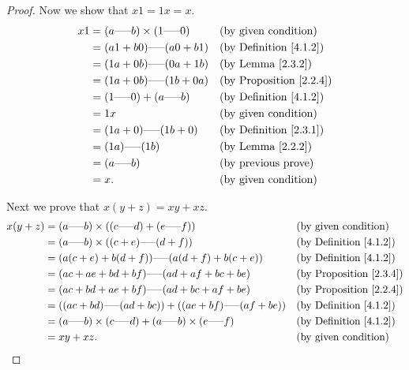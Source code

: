\begin{proof}
Now we show that \(x1 = 1x = x\).
\begin{align*}
x1 &= (a \text{-----} b) \times (1 \text{-----} 0) && \text{(by given condition)} \\
&= (a1 + b0) \text{-----} (a0 + b1) && \text{(by Definition \ref{4.1.2})} \\
&= (1a + 0b) \text{-----} (0a + 1b) && \text{(by Lemma \ref{2.3.2})} \\
&= (1a + 0b) \text{-----} (1b + 0a) && \text{(by Proposition \ref{2.2.4})} \\
&= (1 \text{-----} 0) + (a \text{-----} b) && \text{(by Definition \ref{4.1.2})} \\
&= 1x && \text{(by given condition)} \\
&= (1a + 0) \text{-----} (1b + 0) && \text{(by Definition \ref{2.3.1})} \\
&= (1a) \text{-----} (1b) && \text{(by Lemma \ref{2.2.2})} \\
&= (a \text{-----} b) && \text{(by previous prove)} \\
&= x. && \text{(by given condition)}
\end{align*}

Next we prove that \(x(y + z) = xy + xz\).
\begin{align*}
x(y + z) &= (a \text{-----} b) \times ((c \text{-----} d) + (e \text{-----} f)) && \text{(by given condition)} \\
&= (a \text{-----} b) \times ((c + e) \text{-----} (d + f)) && \text{(by Definition \ref{4.1.2})} \\
&= (a(c + e) + b(d + f)) \text{-----} (a(d + f) + b(c + e)) && \text{(by Definition \ref{4.1.2})} \\
&= (ac + ae + bd + bf) \text{-----} (ad + af + bc + be) && \text{(by Proposition \ref{2.3.4})} \\
&= (ac + bd + ae + bf) \text{-----} (ad + bc + af + be) && \text{(by Proposition \ref{2.2.4})} \\
&= ((ac + bd) \text{-----} (ad + bc)) + ((ae + bf) \text{-----} (af + be)) && \text{(by Definition \ref{4.1.2})} \\
&= (a \text{-----} b) \times (c \text{-----} d) + (a \text{-----} b) \times (e \text{-----} f) && \text{(by Definition \ref{4.1.2})} \\
&= xy + xz. && \text{(by given condition)}
\end{align*}


\end{proof}
